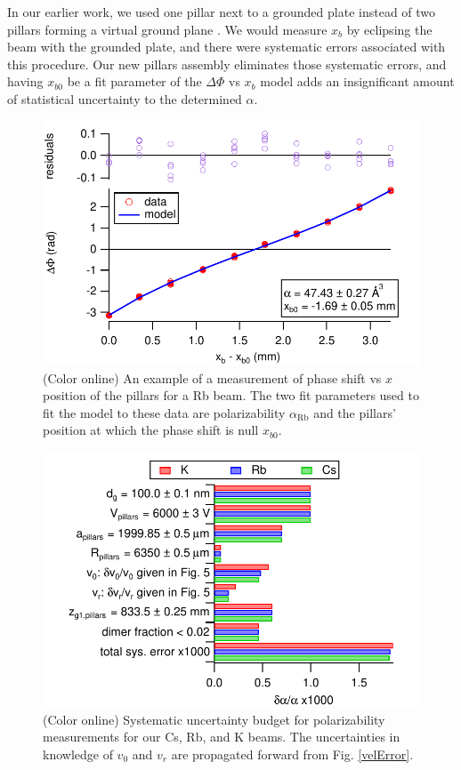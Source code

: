 \documentclass[twocolumn,prl,showpacs,superscriptaddress]{revtex4-1}   %
\newcommand{\figref}[1]{Fig. \ref{#1}}
\newcommand{\arb}{\alpha_{\textrm{Rb}}}
\begin{document}
In our earlier work, we used one pillar next to a grounded plate instead of two pillars forming a virtual ground plane \cite{Holmgren2010}. We would measure $x_b$ by eclipsing the beam with the grounded plate, and there were systematic errors associated with this procedure. 
Our new pillars assembly eliminates those systematic errors, and having $x_{b0}$ be a fit parameter of the $\Delta\Phi$ vs $x_b$ model adds an insignificant amount of statistical uncertainty to the determined $\alpha$.

\begin{figure}
\includegraphics[width=\linewidth,keepaspectratio]{dPvMP_150327_q.pdf}
\caption{\label{dPvMPExample}(Color online) An example of a measurement of phase shift vs $x$ position of the pillars for a Rb beam. The two fit parameters used to fit the model to these data are polarizability $\arb$ and the pillars' position at which the phase shift is null $x_{b0}$.}
\end{figure}

\begin{figure}
\includegraphics[width=\linewidth,keepaspectratio]{displayPolErrors.pdf}
\caption{\label{polError}(Color online) Systematic uncertainty budget for polarizability measurements for our Cs, Rb, and K beams.
The uncertainties in knowledge of $v_0$ and $v_r$ are propagated forward from \figref{velError}.}
\end{figure}
\end{document}
